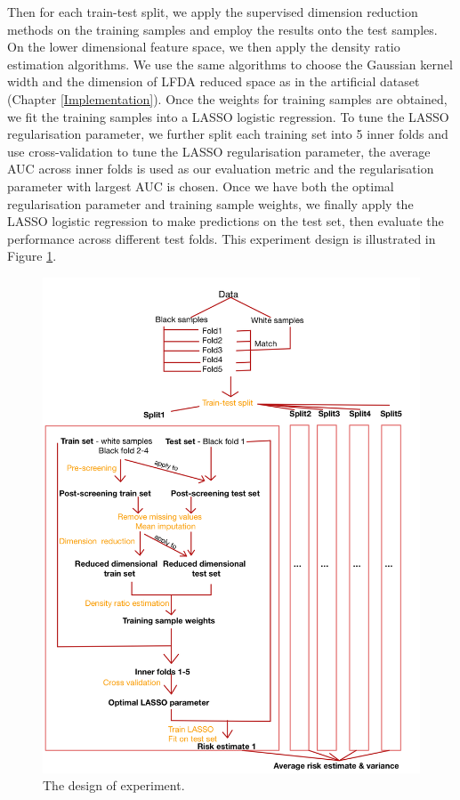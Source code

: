 \documentclass[a4paper,12pt]{article}
\begin{document}
Then for each train-test split, we apply the supervised dimension reduction methods on the training samples and employ the results onto the test samples. On the lower dimensional feature space, we then apply the density ratio estimation algorithms. We use the same algorithms to choose the Gaussian kernel width and the dimension of LFDA reduced space as in the artificial dataset (Chapter \ref{Implementation}). Once the weights for training samples are obtained, we fit the training samples into a LASSO logistic regression. To tune the LASSO regularisation parameter, we further split each training set into 5 inner folds and use cross-validation to tune the LASSO regularisation parameter, the average AUC across inner folds is used as our evaluation metric and the regularisation parameter with largest AUC is chosen. Once we have both the optimal regularisation parameter and training sample weights, we finally apply the LASSO logistic regression to make predictions on the test set, then evaluate the performance across different test folds. This experiment design is illustrated in Figure \ref{experiment png}.

\begin{figure}[H]
    \centering
    \includegraphics[width=\textwidth,height=\textheight,keepaspectratio]{flow chart.png}
    \caption{The design of experiment.}
    \label{experiment png}
\end{figure}
\pagebreak
\end{document}
